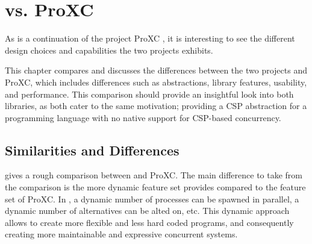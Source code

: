 

\chapter{\Proxc{} vs. ProXC}
\label{ch:proxc++_vs_proxc}

As \Proxc{} is a continuation of the project ProXC \citep{pettersen2016proxc}, it is interesting to see the different design choices and capabilities the two projects exhibits.

This chapter compares and discusses the differences between the two projects \Proxc{} and ProXC, which includes differences such as abstractions, library features, usability, and performance. This comparison should provide an insightful look into both libraries, as both cater to the same motivation; providing a CSP abstraction for a programming language with no native support for CSP\hyp{}based concurrency.


\section{Similarities and Differences}


 gives a rough comparison between \Proxc{} and ProXC. The main difference to take from the comparison is the more dynamic feature set \Proxc{} provides compared to the feature set of ProXC. In \Proxc{}, a dynamic number of processes can be spawned in parallel, a dynamic number of alternatives can be alted on, etc. This dynamic approach allows to create more flexible and less hard coded programs, and consequently creating more maintainable and expressive concurrent systems.

